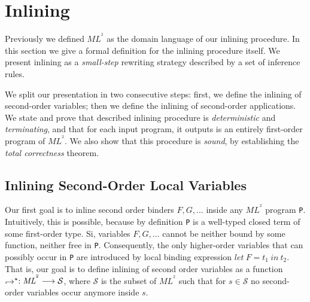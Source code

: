 \documentclass[a4paper,11pt,oneside]{article}
\theoremstyle{plain}
\newcommand{\tmlet}[3]{let~#1=#2~in~#3}
\newcommand{\bwedge}{\boldsymbol{~\wedge~}}
\newcommand{\inlS}{\mathcal{S}}
\newcommand{\inlsrc}{\textit{ML}^{^2}}
\newcommand{\hookdownarrow}{\mathrel{\rotatebox[origin=c]{180}{$\hookleftarrow$}}}
\newcommand{\inlletstar}{\hookdownarrow^{\star}}
\begin{document}
\section{Inlining}

 Previously we defined $\inlsrc$ as the domain language of our inlining procedure. 
 In this section we give a formal definition for the inlining procedure itself.
 We present inlining as a \textit{small-step} rewriting strategy described by a set of inference rules.
 
 We split our presentation in two consecutive steps: first, we define the inlining of second-order variables; then we define the inlining of second-order applications.
 We state and prove that described inlining procedure is \textit{deterministic} and \textit{terminating}, and that for each input program, it outputs is an entirely first-order program of $\inlsrc$. We also show that this procedure is \textit{sound}, by establishing the \textit{total correctness} theorem.\\

	
%


\subsection{Inlining Second-Order Local Variables}
	Our first goal is to inline second order binders $F,G,...$ inside any $\inlsrc$ program \texttt{P}. 
	Intuitively, this is possible, because by definition \texttt{P} is a well-typed closed term of some first-order type.
	Si, variables $F,G,...$ cannot be neither bound by some function, neither free in \texttt{P}. 
	Consequently, the only higher-order variables that can possibly occur in \texttt{P} are introduced by local binding expression $\tmlet{F}{t_1}{t_2}$.
	That is, our goal is to define inlining of second order variables as a function  $\inlletstar : \inlsrc \longrightarrow \inlS$, where $\inlS$ is the subset of $\inlsrc$ such that for $s \in \inlS$ no second-order variables occur anymore inside $s$. \\
	 
\end{document}
